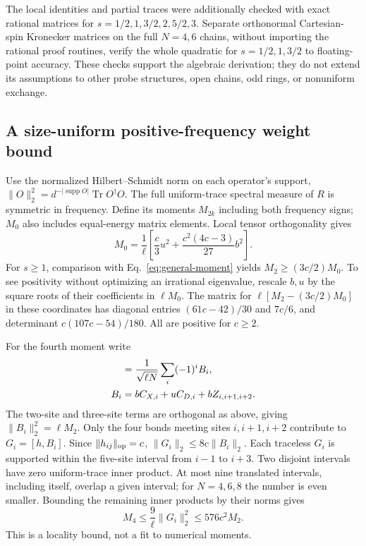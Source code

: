 The local identities and partial traces were additionally checked with
exact rational matrices for $s=1/2,1,3/2,2,5/2,3$. Separate orthonormal
Cartesian-spin Kronecker matrices on the full $N=4,6$ chains, without
importing the rational proof routines, verify the whole quadratic for
$s=1/2,1,3/2$ to floating-point accuracy. These checks support the
algebraic derivation; they do not extend its assumptions to other probe
structures, open chains, odd rings, or nonuniform exchange.

\subsection{A size-uniform positive-frequency weight bound}
\label{app:weight-bound}

Use the normalized Hilbert--Schmidt norm on each operator's support,
$\|O\|_2^2=d^{-|\operatorname{supp}O|}\operatorname{Tr}O^\dagger O$.
The full uniform-trace spectral measure of $R$ is symmetric in frequency.
Define its moments $M_{2k}$ including both frequency signs; $M_0$ also
includes equal-energy matrix elements. Local tensor orthogonality gives
\begin{equation}
 M_0=\frac{1}{\ell}\left[\frac{c}{3}u^2
          +\frac{c^2(4c-3)}{27}b^2\right].
 \label{eq:uniform-M0}
\end{equation}
For $s\ge1$, comparison with Eq.~\eqref{eq:general-moment} yields
$M_2\ge(3c/2)M_0$. To see positivity without optimizing an irrational
eigenvalue, rescale $b,u$ by the square roots of their coefficients in
$\ell M_0$. The matrix for $\ell[M_2-(3c/2)M_0]$ in these coordinates has
diagonal entries $(61c-42)/30$ and $7c/6$, and determinant
$c(107c-54)/180$. All are positive for $c\ge2$.

For the fourth moment write
\begin{align}
 [h,R]&=\frac{1}{\sqrt{\ell N}}\sum_i(-1)^i B_i,\notag\\
 B_i&=bC_{X,i}+uC_{D,i}+bZ_{i,i+1,i+2}.
\end{align}
The two-site and three-site terms are orthogonal as above, giving
$\|B_i\|_2^2=\ell M_2$. Only the four bonds meeting sites $i,i+1,i+2$
contribute to $G_i=[h,B_i]$. Since $\|h_{ij}\|_{\rm op}=c$,
$\|G_i\|_2\le8c\|B_i\|_2$. Each traceless $G_i$ is supported within
the five-site interval from $i-1$ to $i+3$. Two disjoint intervals have
zero uniform-trace inner product. At most nine translated intervals,
including itself, overlap a given interval; for $N=4,6,8$ the number is
even smaller. Bounding the remaining inner products by their norms gives
\begin{equation}
 M_4\le\frac{9}{\ell}\|G_i\|_2^2
      \le576c^2M_2.
 \label{eq:uniform-M4-bound}
\end{equation}
This is a locality bound, not a fit to numerical moments.

